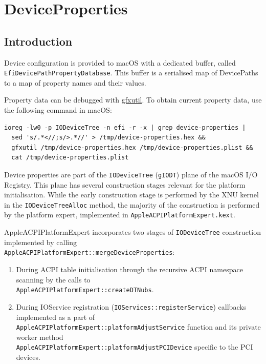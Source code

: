 \documentclass[]{article}
\makeatletter
\providecommand{\tightlist}{%
  \setlength{\itemsep}{0pt}\setlength{\parskip}{0pt}}
\renewcommand{\label}[1]{%
\zref@wrapper@immediate{\oldlabel{#1}}}  %
\makeatother
\begin{document}
\section{DeviceProperties}\label{devprops}

\subsection{Introduction}\label{devpropsintro}

Device configuration is provided to macOS with a dedicated buffer,
called \texttt{EfiDevicePathPropertyDatabase}. This buffer is a serialised
map of DevicePaths to a map of property names and their values.

Property data can be debugged with
\href{https://github.com/acidanthera/gfxutil}{gfxutil}.
To obtain current property data, use the following command in macOS:
\begin{lstlisting}[label=gfxutil, style=ocbash]
ioreg -lw0 -p IODeviceTree -n efi -r -x | grep device-properties |
  sed 's/.*<//;s/>.*//' > /tmp/device-properties.hex &&
  gfxutil /tmp/device-properties.hex /tmp/device-properties.plist &&
  cat /tmp/device-properties.plist
\end{lstlisting}

Device properties are part of the \texttt{IODeviceTree} (\texttt{gIODT})
plane of the macOS I/O Registry. This plane has several construction stages
relevant for the platform initialisation. While the early construction
stage is performed by the XNU kernel in the \texttt{IODeviceTreeAlloc}
method, the majority of the construction is performed by the platform expert,
implemented in \texttt{AppleACPIPlatformExpert.kext}.

AppleACPIPlatformExpert incorporates two stages of \texttt{IODeviceTree}
construction implemented by calling \\
\texttt{AppleACPIPlatformExpert::mergeDeviceProperties}:

\begin{enumerate}
  \tightlist
  \item During ACPI table initialisation through the recursive ACPI namespace scanning
  by the calls to \\
  \texttt{AppleACPIPlatformExpert::createDTNubs}.
  \item During IOService registration (\texttt{IOServices::registerService}) callbacks
  implemented as a part of \\
  \texttt{AppleACPIPlatformExpert::platformAdjustService}
  function and its private worker method \\
  \texttt{AppleACPIPlatformExpert::platformAdjustPCIDevice}
  specific to the PCI devices.
\end{enumerate}
\end{document}
